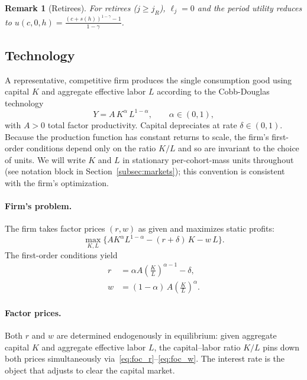 \documentclass[12pt,a4paper]{article}
\newtheorem{remark}{Remark}
\begin{document}
\begin{remark}[Retirees]
\label{rem:retirees}
For retirees ($j \geq j_R$), $\ell_j = 0$ and the period utility reduces to $u(c, 0, h) = \frac{(c + s(h))^{1-\gamma} - 1}{1-\gamma}$.
\end{remark}


\subsection{Technology}
\label{subsec:technology}

A representative, competitive firm produces the single consumption good using capital $K$ and aggregate effective labor $L$ according to the Cobb-Douglas technology
\begin{equation}
\label{eq:production}
Y = A\, K^\alpha\, L^{1-\alpha}, \qquad \alpha \in (0,1),
\end{equation}
with $A > 0$ total factor productivity. Capital depreciates at rate $\delta \in (0,1)$. Because the production function has constant returns to scale, the firm's first-order conditions depend only on the ratio $K/L$ and so are invariant to the choice of units. We will write $K$ and $L$ in stationary per-cohort-mass units throughout (see notation block in Section~\ref{subsec:markets}); this convention is consistent with the firm's optimization.
 
\paragraph{Firm's problem.}
The firm takes factor prices $(r, w)$ as given and maximizes static profits:
\begin{equation}
\label{eq:firm_problem}
\max_{K, L} \bigl\{A K^\alpha L^{1-\alpha} - (r+\delta)\,K - w\,L\bigr\}.
\end{equation}
The first-order conditions yield
\begin{align}
r &= \alpha A \left(\frac{K}{L}\right)^{\alpha-1} - \delta, \label{eq:foc_r} \\
w &= (1-\alpha)\, A \left(\frac{K}{L}\right)^{\alpha}. \label{eq:foc_w}
\end{align}

\paragraph{Factor prices.}
Both $r$ and $w$ are determined endogenously in equilibrium: given aggregate capital $K$ and aggregate effective labor $L$, the capital--labor ratio $K/L$ pins down both prices simultaneously via~\eqref{eq:foc_r}--\eqref{eq:foc_w}. The interest rate is the object that adjusts to clear the capital market.
\end{document}

